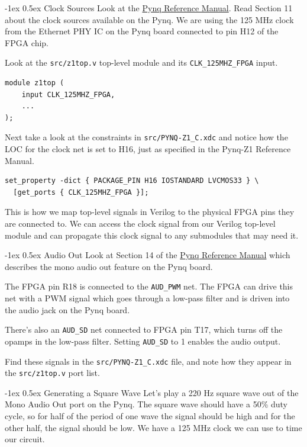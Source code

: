 \documentclass[11pt]{article}
\makeatletter
\renewcommand{\subsection}
{\@startsection {subsection}{1}{0pt}
 {-1ex}
 {0.5ex}
 {\bfseries\normalsize}}
\makeatother
\begin{document}
\subsection{Clock Sources}
Look at the \href{https://reference.digilentinc.com/reference/programmable-logic/pynq-z1/reference-manual}{Pynq Reference Manual}.
Read Section 11 about the clock sources available on the Pynq.
We are using the 125 MHz clock from the Ethernet PHY IC on the Pynq board connected to pin H12 of the FPGA chip.

Look at the \texttt{src/z1top.v} top-level module and its \verb|CLK_125MHZ_FPGA| input.
\begin{verbatim}
module z1top (
    input CLK_125MHZ_FPGA,
    ...
);
\end{verbatim}
Next take a look at the constraints in \texttt{src/PYNQ-Z1\_C.xdc} and notice how the LOC for the clock net is set to H16, just as specified in the Pynq-Z1 Reference Manual.
\begin{verbatim}
set_property -dict { PACKAGE_PIN H16 IOSTANDARD LVCMOS33 } \
  [get_ports { CLK_125MHZ_FPGA }];
\end{verbatim}
This is how we map top-level signals in Verilog to the physical FPGA pins they are connected to.
We can access the clock signal from our Verilog top-level module and can propagate this clock signal to any submodules that may need it.

\subsection{Audio Out}
Look at Section 14 of the \href{https://reference.digilentinc.com/reference/programmable-logic/pynq-z1/reference-manual}{Pynq Reference Manual} which describes the mono audio out feature on the Pynq board.

The FPGA pin R18 is connected to the \verb|AUD_PWM| net.
The FPGA can drive this net with a PWM signal which goes through a low-pass filter and is driven into the audio jack on the Pynq board.

There's also an \verb|AUD_SD| net connected to FPGA pin T17, which turns off the opamps in the low-pass filter.
Setting \verb|AUD_SD| to 1 enables the audio output.

Find these signals in the \texttt{src/PYNQ-Z1\_C.xdc} file, and note how they appear in the \texttt{src/z1top.v} port list.

\subsection{Generating a Square Wave}
Let's play a 220 Hz square wave out of the Mono Audio Out port on the Pynq.
The square wave should have a 50\% duty cycle, so for half of the period of one wave the signal should be high and for the other half, the signal should be low.
We have a 125 MHz clock we can use to time our circuit.
\end{document}
